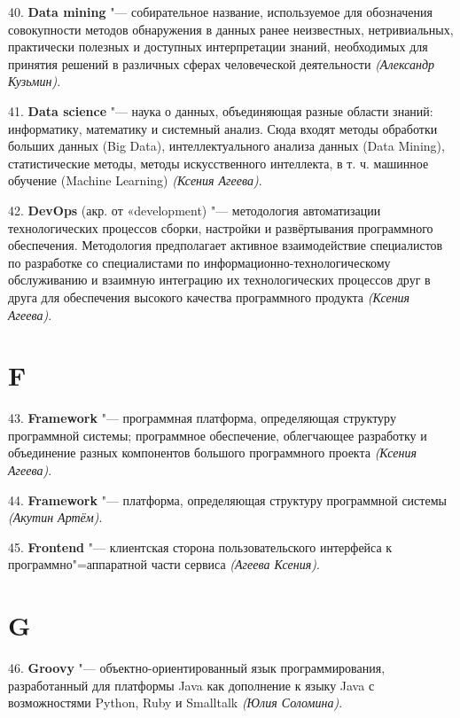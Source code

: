 \documentclass{article}
\begin{document}
\hspace{0.42cm} 40. \textbf{Data mining} "--- собирательное название, используемое для
обозначения совокупности методов обнаружения в данных ранее неизвестных,
нетривиальных, практически полезных и доступных интерпретации знаний,
необходимых для принятия решений в различных сферах человеческой деятельности
\textit{(Александр Кузьмин)}.

41. \textbf{Data science} "--- наука о данных, объединяющая разные области
знаний: информатику, математику и системный анализ. Сюда входят методы обработки
больших данных (Big Data), интеллектуального анализа данных (Data Mining),
статистические методы, методы искусственного интеллекта, в т. ч. машинное
обучение (Machine Learning) \textit{(Ксения Агеева)}.

42. \textbf{DevOps} (акр. от «development) "--- методология автоматизации
технологических процессов сборки, настройки и развёртывания программного
обеспечения. Методология предполагает активное взаимодействие специалистов по
разработке со специалистами по информационно-технологическому обслуживанию и
взаимную интеграцию их технологических процессов друг в друга для обеспечения
высокого качества программного продукта \textit{(Ксения Агеева)}.

\section*{F}

\hspace{0.33cm} 43. \textbf{Framework} "--- программная платформа, определяющая структуру
программной системы; программное обеспечение, облегчающее разработку и
объединение разных компонентов большого программного проекта \textit{(Ксения
Агеева)}.

44. \textbf{Framework} "--- платформа, определяющая структуру программной
системы \textit{(Акутин Артём)}.

45. \textbf{Frontend} "--- клиентская сторона пользовательского интерфейса к
программно"=аппаратной части сервиса \textit{(Агеева Ксения)}.

\section*{G}

\hspace{0.33cm} 46. \textbf{Groovy} "--- объектно-ориентированный язык программирования,
разработанный для платформы Java как дополнение к языку Java с возможностями
Python, Ruby и Smalltalk \textit{(Юлия Соломина)}.
\end{document}
